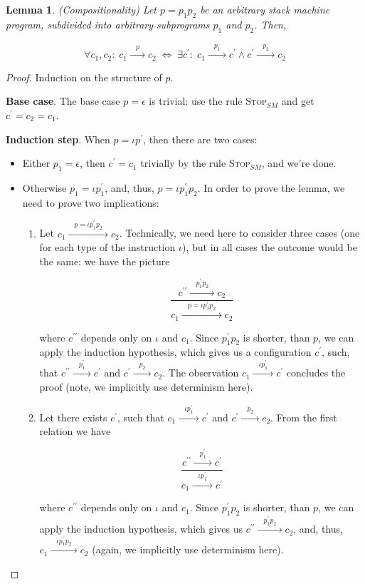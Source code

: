\documentclass{article}
\def\transarrow{\xrightarrow}
\def\padding{\phantom{X}}
\newcommand{\trule}[2]{\frac{#1}{#2}}
\newcommand{\trans}[3]{{#1}\transarrow{\padding#2\padding}{#3}}
\newcommand{\rulename}[1]{\textsc{#1}}
\newtheorem{lemma}{Lemma}
\theoremstyle{definition}
\begin{document}
\begin{lemma} (Compositionality)
  Let $p=p_1p_2$ be an arbitrary stack machine program, subdivided into arbitrary subprograms $p_1$ and $p_2$. Then,

  \[
  \forall c_1, c_2:\;\trans{c_1}{p}{c_2}\;\Leftrightarrow\;\exists c^\prime:\; \trans{c_1}{p_1}{c^\prime} \wedge \trans{c^\prime}{p_2}{c_2}
  \]
\end{lemma}
\begin{proof}
  Induction on the structure of $p$.
  
  \textbf{Base case}. The base case $p=\epsilon$ is trivial: use the rule \rulename{Stop$_{SM}$} and get $c^\prime=c_2=c_1$.
  
  \textbf{Induction step}. When $p=\iota p^\prime$, then there are two cases:

  \begin{itemize}
    \item Either $p_1=\epsilon$, then $c^\prime=c_1$ trivially by the rule \rulename{Stop$_{SM}$}, and we're done.
    \item Otherwise $p_1=\iota p_1^\prime$, and, thus, $p=\iota p_1^\prime p_2$. In order to prove the lemma, we need to prove two implications:
      \begin{enumerate}
      \item Let $\trans{c_1}{p=\iota p_1^\prime p_2}{c_2}$. Technically, we need here to consider three cases (one for each type of the instruction
        $\iota$), but in all cases the outcome would be the same: we have the picture

        \[
        \trule{\trans{c^{\prime\prime}}{p_1^\prime p_2}{c_2}}{\trans{c_1}{p=\iota p_1^\prime p_2}{c_2}}
        \]

        where $c^{\prime\prime}$ depends only on $\iota$ and $c_1$. Since $p_1^\prime p_2$ is shorter, than $p$, we can apply the induction hypothesis, which gives us a
        configuration $c^\prime$, such, that $\trans{c^{\prime\prime}}{p_1^\prime}{c^\prime}$ and $\trans{c^\prime}{p_2}{c_2}$. The observation $\trans{c_1}{\iota p_1^\prime}{c^\prime}$
        concludes the proof (note, we implicitly use determinism here).
      \item Let there exists $c^\prime$, such that $\trans{c_1}{\iota p_1^\prime}{c^\prime}$ and $\trans{c^\prime}{p_2}{c_2}$. From the first relation we have

        \[
          \trule{\trans{c^{\prime\prime}}{p_1^\prime}{c^\prime}}{\trans{c_1}{\iota p_1^\prime}{c^\prime}}
        \]

        where $c^{\prime\prime}$ depends only on $\iota$ and $c_1$. Since $p_1^\prime p_2$ is shorter, than $p$, we can apply the induction hypothesis, which
        gives us $\trans{c^{\prime\prime}}{p_1^\prime p_2}{c_2}$, and, thus, $\trans{c_1}{\iota p_1^\prime p_2}{c_2}$ (again, we implicitly use determinism here).
      \end{enumerate}
  \end{itemize}
\end{proof}
\end{document}
